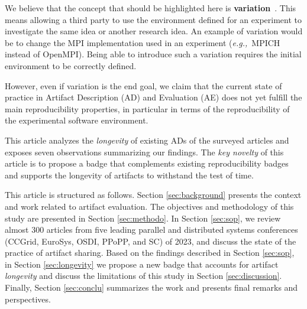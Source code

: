 \documentclass[sigconf,natbib=false]{acmart}
\newcommand{\eg}{\emph{e.g.,}}
\newcommand{\ad}{AD}
\newcommand{\aeval}{AE}
\begin{document}

We believe that the concept that should be highlighted here is \textbf{variation}\ \cite{mercier2018considering, feitelson_repeatability_2015}.
This means allowing a third party to use the environment defined for an experiment to investigate the same idea or another research idea.
An example of variation would be to change the MPI implementation used in an experiment (\eg\ MPICH instead of OpenMPI).
Being able to introduce such a variation requires the initial environment to be correctly defined.

However, even if variation is the end goal, we claim that the current state of practice in Artifact Description (\ad) and Evaluation (\aeval) does not yet fulfill the main reproducibility properties, in particular in terms of the reproducibility of the experimental software environment.

This article analyzes the \emph{longevity} of existing \ad s of the surveyed articles and exposes seven observations summarizing our findings.
The \textit{key novelty} of this article is to propose a badge that complements existing reproducibility badges and supports the longevity of artifacts to withstand the test of time. 

This article is structured as follows.
Section \ref{sec:background} presents the context and work related to artifact evaluation.
The objectives and methodology of this study are presented in Section \ref{sec:methodo}.
In Section \ref{sec:sop}, we review almost 300 articles from five leading parallel and distributed systems conferences (CCGrid, EuroSys, OSDI, PPoPP, and SC) of 2023, and discuss the state of the practice of artifact sharing.
Based on the findings described in Section \ref{sec:sop}, in Section \ref{sec:longevity} we propose a new badge that accounts for artifact \emph{longevity} and discuss the limitations of this study in Section \ref{sec:discussion}.
Finally, Section \ref{sec:conclu} summarizes the work and presents final remarks and perspectives.
\end{document}
